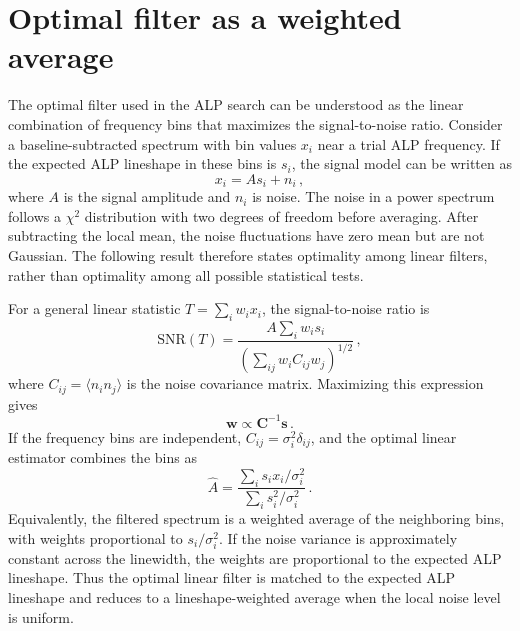 \section{Optimal filter as a weighted average}\label{sec:app:optimal-filter}

The optimal filter used in the ALP search can be understood as the linear combination of frequency bins that maximizes the signal-to-noise ratio.
Consider a baseline-subtracted spectrum with bin values $x_i$ near a trial ALP frequency.
If the expected ALP lineshape in these bins is $s_i$, the signal model can be written as
\begin{equation}
    x_i = A s_i + n_i\,,
\end{equation}
where $A$ is the signal amplitude and $n_i$ is noise.
The noise in a power spectrum follows a $\chi^2$ distribution with two degrees of freedom before averaging.
After subtracting the local mean, the noise fluctuations have zero mean but are not Gaussian.
The following result therefore states optimality among linear filters, rather than optimality among all possible statistical tests.

For a general linear statistic $T=\sum_i w_i x_i$, the signal-to-noise ratio is
\begin{equation}
    \mathrm{SNR}(T)
    =
    \frac{A\sum_i w_i s_i}
         {\left(\sum_{ij} w_i C_{ij} w_j\right)^{1/2}}\,,
\end{equation}
where $C_{ij}=\langle n_i n_j\rangle$ is the noise covariance matrix.
Maximizing this expression gives
\begin{equation}
    \mathbf{w}\propto \mathbf{C}^{-1}\mathbf{s}\,.
    \label{eq:optimal_filter_covariance}
\end{equation}
If the frequency bins are independent, $C_{ij}=\sigma_i^2\delta_{ij}$, and the optimal linear estimator combines the bins as
\begin{equation}
    \hat{A} =
    \frac{\sum_i s_i x_i/\sigma_i^2}
         {\sum_i s_i^2/\sigma_i^2}\,.
    \label{eq:optimal_filter_estimator}
\end{equation}
Equivalently, the filtered spectrum is a weighted average of the neighboring bins, with weights proportional to $s_i/\sigma_i^2$.
If the noise variance is approximately constant across the linewidth, the weights are proportional to the expected ALP lineshape.
Thus the optimal linear filter is matched to the expected ALP lineshape and reduces to a lineshape-weighted average when the local noise level is uniform.


